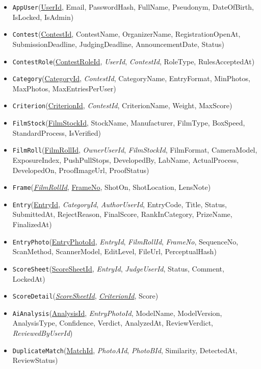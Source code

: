 \begin{itemize}\raggedright
\item \texttt{AppUser}(\underline{UserId}, Email, PasswordHash, FullName, Pseudonym, DateOfBirth, IsLocked, IsAdmin)
\item \texttt{Contest}(\underline{ContestId}, ContestName, OrganizerName, RegistrationOpenAt, SubmissionDeadline, JudgingDeadline, AnnouncementDate, Status)
\item \texttt{ContestRole}(\underline{ContestRoleId}, \textit{UserId}, \textit{ContestId}, RoleType, RulesAcceptedAt)
\item \texttt{Category}(\underline{CategoryId}, \textit{ContestId}, CategoryName, EntryFormat, MinPhotos, MaxPhotos, MaxEntriesPerUser)
\item \texttt{Criterion}(\underline{CriterionId}, \textit{ContestId}, CriterionName, Weight, MaxScore)
\item \texttt{FilmStock}(\underline{FilmStockId}, StockName, Manufacturer, FilmType, BoxSpeed, StandardProcess, IsVerified)
\item \texttt{FilmRoll}(\underline{FilmRollId}, \textit{OwnerUserId}, \textit{FilmStockId}, FilmFormat, CameraModel, ExposureIndex, PushPullStops, DevelopedBy, LabName, ActualProcess, DevelopedOn, ProofImageUrl, ProofStatus)
\item \texttt{Frame}(\textit{\underline{FilmRollId}}, \underline{FrameNo}, ShotOn, ShotLocation, LensNote)
\item \texttt{Entry}(\underline{EntryId}, \textit{CategoryId}, \textit{AuthorUserId}, EntryCode, Title, Status, SubmittedAt, RejectReason, FinalScore, RankInCategory, PrizeName, FinalizedAt)
\item \texttt{EntryPhoto}(\underline{EntryPhotoId}, \textit{EntryId}, \textit{FilmRollId}, \textit{FrameNo}, SequenceNo, ScanMethod, ScannerModel, EditLevel, FileUrl, PerceptualHash)
\item \texttt{ScoreSheet}(\underline{ScoreSheetId}, \textit{EntryId}, \textit{JudgeUserId}, Status, Comment, LockedAt)
\item \texttt{ScoreDetail}(\textit{\underline{ScoreSheetId}}, \textit{\underline{CriterionId}}, Score)
\item \texttt{AiAnalysis}(\underline{AnalysisId}, \textit{EntryPhotoId}, ModelName, ModelVersion, AnalysisType, Confidence, Verdict, AnalyzedAt, ReviewVerdict, \textit{ReviewedByUserId})
\item \texttt{DuplicateMatch}(\underline{MatchId}, \textit{PhotoAId}, \textit{PhotoBId}, Similarity, DetectedAt, ReviewStatus)
\end{itemize}

